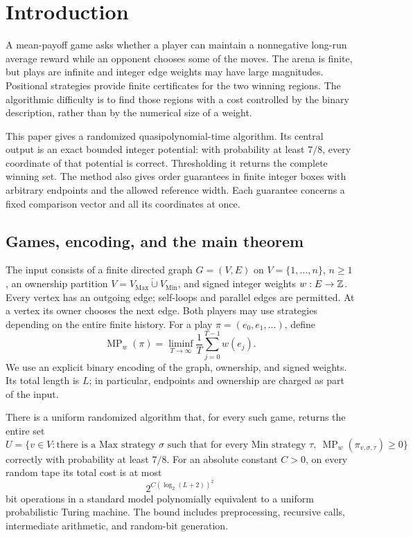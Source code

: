 \section{Introduction}

A mean-payoff game asks whether a player can maintain a nonnegative
long-run average reward while an opponent chooses some of the moves.
The arena is finite, but plays are infinite and integer edge weights may
have large magnitudes. Positional strategies provide finite certificates
for the two winning regions. The algorithmic difficulty is to find those
regions with a cost controlled by the binary description, rather than by
the numerical size of a weight.

This paper gives a randomized quasipolynomial-time algorithm. Its central
output is an exact bounded integer potential: with probability at least
$7/8$, every coordinate of that potential is correct. Thresholding it
returns the complete winning set. The method also gives order guarantees
in finite integer boxes with arbitrary endpoints and the allowed reference
width. Each guarantee concerns a fixed comparison vector and all its
coordinates at once.

\subsection{Games, encoding, and the main theorem}

The input consists of a finite directed graph $G=(V,E)$ on
$V=\{1,\ldots,n\}$, $n\ge1$, an ownership partition
$V=V_{\mathrm{Max}}\mathbin{\dot\cup}V_{\mathrm{Min}}$, and signed
integer weights $w:E\to\mathbb Z$. Every vertex has an outgoing edge;
self-loops and parallel edges are permitted. At a vertex its owner
chooses the next edge. Both players may use strategies depending on the
entire finite history. For a play $\pi=(e_0,e_1,\ldots)$, define
\[
 \operatorname{MP}_w(\pi)
 =\liminf_{T\to\infty}\frac1T\sum_{j=0}^{T-1}w(e_j).
\]
We use an explicit binary encoding of the graph, ownership, and signed
weights. Its total length is $L$; in particular, endpoints and ownership
are charged as part of the input.

\begin{theorem}\label{thm:main}
There is a uniform randomized algorithm that, for every such game,
returns the entire set
\[
 U=\{v\in V:\text{there is a Max strategy }\sigma
       \text{ such that for every Min strategy }\tau,\ 
       \operatorname{MP}_w(\pi_{v,\sigma,\tau})\ge0\}
\]
correctly with probability at least $7/8$.
For an absolute constant $C>0$, on every random tape its total cost is at
most
\[
 2^{C(\log_2(L+2))^2}
\]
bit operations in a standard model polynomially equivalent to a uniform
probabilistic Turing machine. The bound includes preprocessing, recursive
calls, intermediate arithmetic, and random-bit generation.
\end{theorem}

